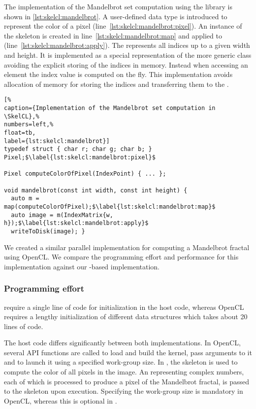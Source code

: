 The implementation of the Mandelbrot set computation using the \SkelCL library is shown in \autoref{lst:skelcl:mandelbrot}.
A user-defined data type is introduced to represent the color of a pixel (line~\ref{lst:skelcl:mandelbrot:pixel}).
An instance of the \map skeleton is created in line~\ref{lst:skelcl:mandelbrot:map} and applied to  (line~\ref{lst:skelcl:mandelbrot:apply}).
The  represents all indices up to a given width and height.
It is implemented as a special representation of the more generic  class avoiding the explicit storing of the indices in memory.
Instead when accessing an element the index value is computed on the fly.
This implementation avoids allocation of memory for storing the indices and transferring them to the \GPU.


\begin{lstlisting}[%                                                             
caption={Implementation of the Mandelbrot set computation in \SkelCL},%
numbers=left,%
float=tb,
label={lst:skelcl:mandelbrot}]
typedef struct { char r; char g; char b; } Pixel;$\label{lst:skelcl:mandelbrot:pixel}$

Pixel computeColorOfPixel(IndexPoint) { ... };

void mandelbrot(const int width, const int height) {
  auto m = map(computeColorOfPixel);$\label{lst:skelcl:mandelbrot:map}$
  auto image = m(IndexMatrix{w, h});$\label{lst:skelcl:mandelbrot:apply}$
  writeToDisk(image); }
\end{lstlisting}

We created a similar parallel implementation for computing a Mandelbrot fractal using OpenCL.
We compare the programming effort and performance for this implementation against our \SkelCL-based implementation.

\subsubsection*{Programming effort}
\label{sec:mandelbrot:programming}

\SkelCL require a single line of code for initialization in the host code, whereas OpenCL requires a lengthy initialization of different data structures which takes about 20 lines of code.

The host code differs significantly between both implementations.
In OpenCL, several API functions are called to load and build the kernel, pass arguments to it and to launch it using a specified work-group size.
In \SkelCL, the \map skeleton is used to compute the color of all pixels in the image.
An  representing complex numbers, each of which is processed to produce a pixel of the Mandelbrot fractal, is passed to the \map skeleton upon execution.
Specifying the work-group size is mandatory in OpenCL, whereas this is optional in \SkelCL.


